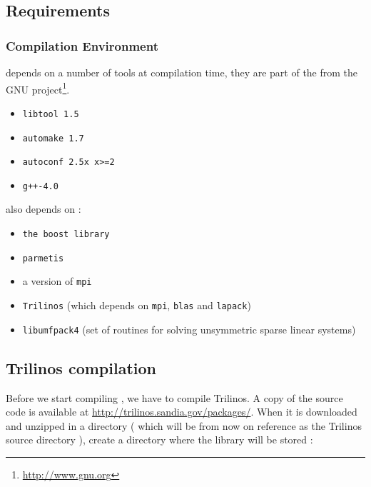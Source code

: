 \subsection{Requirements}

\subsubsection{Compilation Environment}
\label{sec:comp-envir}

\lifev depends on a number of tools at compilation time, they are part
of the  from the GNU project\footnote{\url{http://www.gnu.org}}.

\begin{itemize}
\item \verb!libtool 1.5!
\item \verb!automake 1.7!
\item \verb!autoconf 2.5x x>=2!
\item \verb!g++-4.0 !
\end{itemize}

\lifev also depends on :

\begin{itemize}
\item \verb!the boost library!
\item \verb!parmetis!
\item a version of \verb!mpi!
\item \verb!Trilinos! (which depends on \verb!mpi!, \verb!blas! and \verb!lapack!)
\item \verb!libumfpack4! (set of routines for solving unsymmetric sparse linear systems)
\end{itemize}





\subsection{Trilinos compilation}
Before we start compiling \lifev, we have to compile Trilinos. A copy of the source
code is available at \url{http://trilinos.sandia.gov/packages/}. When it is
downloaded and unzipped in a directory ( which will be from now on reference as the Trilinos
source directory ), create a directory where the library will be stored :

